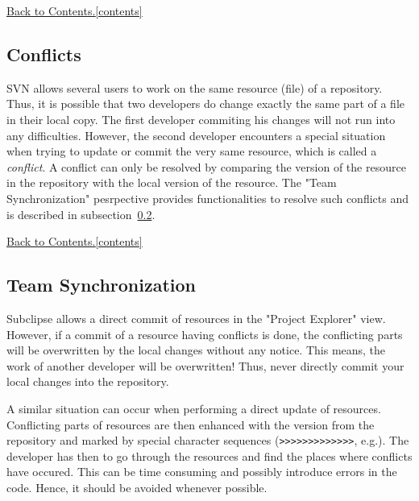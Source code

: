 \documentclass[11pt, oneside]{scrartcl}
\newcommand{\backtocontents}{\hyperref[contents]{Back to Contents.\ref*{contents}}}
\begin{document}
\backtocontents


\subsection{Conflicts}

SVN allows several users to work on the same resource (file) of a repository.
Thus, it is possible that two developers do change exactly the same part of a
file in their local copy. The first developer commiting his changes will not run
into any difficulties. However, the second developer encounters a special
situation when trying to update or commit the very same resource, which is
called a \textit{conflict}. A conflict can only be resolved by comparing the
version of the resource in the repository with the local version of the
resource. The "Team Synchronization" pesrpective provides functionalities to
resolve such conflicts and is described in subsection~\ref{sec:subclipse-teamsync}.

\backtocontents


\subsection{Team Synchronization} \label{sec:subclipse-teamsync}

Subclipse allows a direct commit of resources in the "Project Explorer" view.
However, if a commit of a resource having conflicts is done, the conflicting
parts will be overwritten by the local changes without any notice. This means,
the work of another developer will be overwritten! Thus, never directly commit
your local changes into the repository.

A similar situation can occur when performing a direct update of resources.
Conflicting parts of resources are then enhanced with the version from the
repository and marked by special character sequences (\verb|>>>>>>>>>>>>>|,
e.g.). The developer has then to go through the resources and find the places
where conflicts have occured. This can be time consuming and possibly introduce
errors in the code. Hence, it should be avoided whenever possible.
\end{document}
